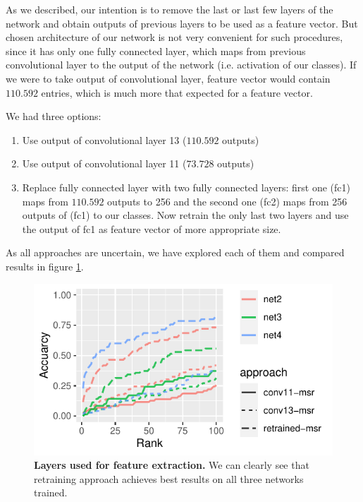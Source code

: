 \documentclass[fleqn,moreauthors,10pt]{ds_report}
\begin{document}
As we described, our intention is to remove the last or last few layers of the network and obtain outputs of previous layers to be used as a feature vector. But chosen architecture of our network is not very convenient for such procedures, since it has only one fully connected layer, which maps from previous convolutional layer to the output of the network (i.e. activation of our classes). If we were to take output of convolutional layer, feature vector would contain $110.592$ entries, which is much more that expected for a feature vector.

\newpage

We had three options:
\begin{enumerate}
	\itemsep0em
	\item Use output of convolutional layer 13 ($110.592$ outputs)
	\item Use output of convolutional layer 11 ($73.728$ outputs)
	\item Replace fully connected layer with two fully connected layers: first one (fc1) maps from $110.592$ outputs to 256 and the second one (fc2) maps from 256 outputs of (fc1) to our classes. Now retrain the only last two layers and use the output of fc1 as feature vector of more appropriate size.
\end{enumerate}

As all approaches are uncertain, we have explored each of them and compared results in figure \ref{fig:ranks-layer-selection}.

\begin{figure}[htb]\centering
	\includegraphics[width=\linewidth]{ranks-ident-layer-selection.pdf}
	\caption{\textbf{Layers used for feature extraction.} We can clearly see that retraining approach achieves best results on all three networks trained.}
	\label{fig:ranks-layer-selection}
\end{figure}
\end{document}
